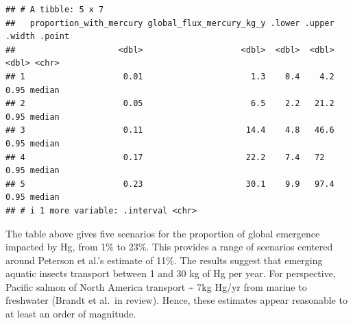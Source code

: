 \documentclass[
]{article}
\begin{document}
\begin{verbatim}
## # A tibble: 5 x 7
##   proportion_with_mercury global_flux_mercury_kg_y .lower .upper .width .point
##                     <dbl>                    <dbl>  <dbl>  <dbl>  <dbl> <chr> 
## 1                    0.01                      1.3    0.4    4.2   0.95 median
## 2                    0.05                      6.5    2.2   21.2   0.95 median
## 3                    0.11                     14.4    4.8   46.6   0.95 median
## 4                    0.17                     22.2    7.4   72     0.95 median
## 5                    0.23                     30.1    9.9   97.4   0.95 median
## # i 1 more variable: .interval <chr>
\end{verbatim}

The table above gives five scenarios for the proportion of global
emergence impacted by Hg, from 1\% to 23\%. This provides a range of
scenarios centered around Peterson et al.'s estimate of 11\%. The
results suggest that emerging aquatic insects transport between 1 and 30
kg of Hg per year. For perspective, Pacific salmon of North America
transport \textasciitilde{} 7kg Hg/yr from marine to freshwater (Brandt
et al.~in review). Hence, these estimates appear reasonable to at least
an order of magnitude.
\end{document}
